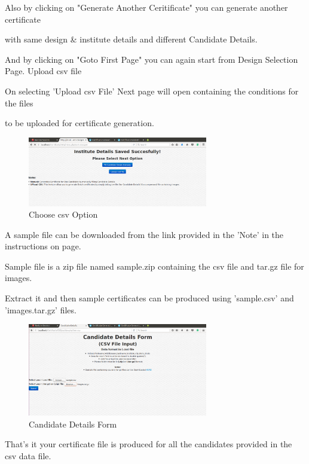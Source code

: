     Also by clicking on "Generate Another Ceritificate" you can generate another certificate

    with same design & institute details and different Candidate Details.

    And by clicking on "Goto First Page" you can again start from Design Selection Page.
    Upload csv file

    On selecting 'Upload csv File' Next page will open containing the conditions for the files

    to be uploaded for certificate generation.
\begin{figure}[!ht]
\centering
\includegraphics[width=0.7\textwidth]{input/images/cgs/cgs3.png}                  
\caption{Choose csv Option}
\hspace{-1.5em}
\end{figure}
    A sample file can be downloaded from the link provided in the 'Note' in the instructions on page.

    Sample file is a zip file named sample.zip containing the csv file and tar.gz file for images.

    Extract it and then sample certificates can be produced using 'sample.csv' and 'images.tar.gz' files.

\begin{figure}[!ht]
\centering
\includegraphics[width=0.7\textwidth]{input/images/cgs/cgs9.png}                 
\caption{Candidate Details Form}
\hspace{-1.5em}
\end{figure}


    That's it your certificate file is produced for all the candidates provided in the csv data file.

